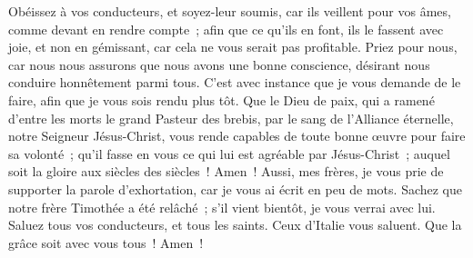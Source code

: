 \begin{multicols}{2}
Obéissez à vos conducteurs, et soyez-leur soumis, car ils veillent pour vos âmes, comme devant en rendre compte~; afin que ce qu'ils en font, ils le fassent avec joie, et non en gémissant, car cela ne vous serait pas profitable.
 Priez pour nous, car nous nous assurons que nous avons une bonne conscience, désirant nous conduire honnêtement parmi tous.
C'est avec instance que je vous demande de le faire, afin que je vous sois rendu plus tôt.
Que le Dieu de paix, qui a ramené d'entre les morts le grand Pasteur des brebis, par le sang de l'Alliance éternelle, notre Seigneur Jésus-Christ,
vous rende capables de toute bonne œuvre pour faire sa volonté~; qu'il fasse en vous ce qui lui est agréable par Jésus-Christ~; auquel soit la gloire aux siècles des siècles~! Amen~!
Aussi, mes frères, je vous prie de supporter la parole d'exhortation, car je vous ai écrit en peu de mots.
Sachez que notre frère Timothée a été relâché~; s'il vient bientôt, je vous verrai avec lui.
Saluez tous vos conducteurs, et tous les saints. Ceux d'Italie vous saluent.
Que la grâce soit avec vous tous~! Amen~!
\PPE{}
\end{multicols}
